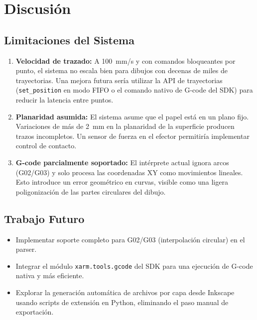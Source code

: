 \documentclass[journal,compsoc]{IEEEtran}
\begin{document}
\section{Discusión}

\subsection{Limitaciones del Sistema}

\begin{enumerate}
    \item \textbf{Velocidad de trazado:} A 100~mm/s y con comandos bloqueantes por punto, el sistema no escala bien para dibujos con decenas de miles de trayectorias. Una mejora futura sería utilizar la API de trayectorias (\texttt{set\_position} en modo FIFO o el comando nativo de G-code del SDK) para reducir la latencia entre puntos.

    \item \textbf{Planaridad asumida:} El sistema asume que el papel está en un plano fijo. Variaciones de más de 2~mm en la planaridad de la superficie producen trazos incompletos. Un sensor de fuerza en el efector permitiría implementar control de contacto.

    \item \textbf{G-code parcialmente soportado:} El intérprete actual ignora arcos (G02/G03) y solo procesa las coordenadas XY como movimientos lineales. Esto introduce un error geométrico en curvas, visible como una ligera poligonización de las partes circulares del dibujo.
\end{enumerate}

\subsection{Trabajo Futuro}

\begin{itemize}
    \item Implementar soporte completo para G02/G03 (interpolación circular) en el parser.
    \item Integrar el módulo \texttt{xarm.tools.gcode} del SDK para una ejecución de G-code nativa y más eficiente.
    \item Explorar la generación automática de archivos por capa desde Inkscape usando scripts de extensión en Python, eliminando el paso manual de exportación.
\end{itemize}
\end{document}
